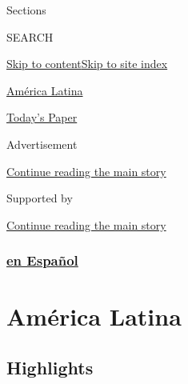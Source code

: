 Sections

SEARCH

\protect\hyperlink{site-content}{Skip to
content}\protect\hyperlink{site-index}{Skip to site index}

\href{https://www.nytimes3xbfgragh.onion/es/section/america-latina}{América
Latina}

\href{https://myaccount.nytimes3xbfgragh.onion/auth/login?response_type=cookie\&client_id=vi}{}

\href{https://www.nytimes3xbfgragh.onion/section/todayspaper}{Today's
Paper}

Advertisement

\protect\hyperlink{after-top}{Continue reading the main story}

Supported by

\protect\hyperlink{after-sponsor}{Continue reading the main story}

\hypertarget{en-espauxf1ol}{%
\subsubsection{\texorpdfstring{\href{/es/}{en
Español}}{en Español}}\label{en-espauxf1ol}}

\hypertarget{amuxe9rica-latina}{%
\section{América Latina}\label{amuxe9rica-latina}}

\hypertarget{highlights}{%
\subsection{Highlights}\label{highlights}}


